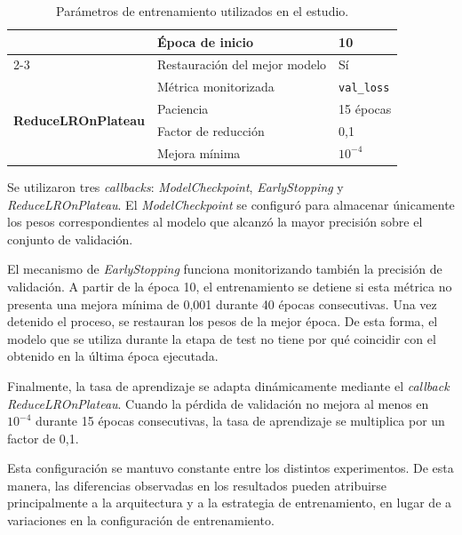 \begin{table}[!ht]
\begin{tabular}{|p{4.5cm}|p{5.2cm}|p{4cm}|}
        ~                                               & Época de inicio               & 10                                        \\ \cline{2-3}
        ~                                               & Restauración del mejor modelo & Sí                                        \\ \hline
        \multirow{4}{*}{\textbf{ReduceLROnPlateau}}     & Métrica monitorizada          & \texttt{val\_loss}                        \\ \cline{2-3}
        ~                                               & Paciencia                     & 15 épocas                                 \\ \cline{2-3}
        ~                                               & Factor de reducción           & 0,1                                       \\ \cline{2-3}
        ~                                               & Mejora mínima                 & \(10^{-4}\)                               \\ \hline
    \end{tabular}
    \caption{Parámetros de entrenamiento utilizados en el estudio.}
    \label{tab:parametros}
\end{table}

Se utilizaron tres \textit{callbacks}: \textit{ModelCheckpoint}, \textit{EarlyStopping} y \textit{ReduceLROnPlateau}. El \textit{ModelCheckpoint} se configuró para almacenar únicamente los pesos correspondientes al modelo que alcanzó la mayor precisión sobre el conjunto de validación.

El mecanismo de \textit{EarlyStopping} funciona monitorizando también la precisión de validación. A partir de la época 10, el entrenamiento se detiene si esta métrica no presenta una mejora mínima de 0,001 durante 40 épocas consecutivas. Una vez detenido el proceso, se restauran los pesos de la mejor época. De esta forma, el modelo que se utiliza durante la etapa de test no tiene por qué coincidir con el obtenido en la última época ejecutada.

Finalmente, la tasa de aprendizaje se adapta dinámicamente mediante el \textit{callback} \textit{ReduceLROnPlateau}. Cuando la pérdida de validación no mejora al menos en \(10^{-4}\) durante 15 épocas consecutivas, la tasa de aprendizaje se multiplica por un factor de 0,1.

Esta configuración se mantuvo constante entre los distintos experimentos. De esta manera, las diferencias observadas en los resultados pueden atribuirse principalmente a la arquitectura y a la estrategia de entrenamiento, en lugar de a variaciones en la configuración de entrenamiento.

